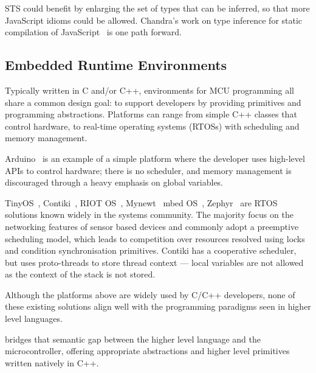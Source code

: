 STS could benefit by enlarging the set of types
that can be inferred, so that more JavaScript idioms could be allowed.
Chandra's work on type inference for static compilation of
JavaScript~\cite{ChandraOOPSLA2016} is one path forward.

\subsection{Embedded Runtime Environments}

Typically written in C and/or C++, environments for MCU programming all share
a common design goal: to support developers by providing primitives and programming
abstractions. Platforms can range from simple C++ classes that control hardware,
to real-time operating systems (RTOSs) with scheduling and memory management.

Arduino~\cite{buildingArduino2014} is an example of a simple platform where the developer uses
high-level APIs to control hardware; there is no scheduler, and memory management
is discouraged through a heavy emphasis on global variables.

TinyOS~\cite{levis2005tinyos}, Contiki~\cite{dunkels2012contiki}, RIOT OS~\cite{baccelli2013riot}, Mynewt~\cite{ApacheMy53:online} mbed OS~\cite{ARMmbed}, Zephyr~\cite{HomeZeph63:online} are RTOS solutions known widely in the systems community. The majority focus on the networking features of sensor based devices and commonly adopt a preemptive scheduling model, which leads to competition over resources resolved using locks and condition synchronisation primitives. Contiki has a cooperative scheduler, but uses proto-threads to store thread context --- local variables are not allowed as the context of the stack is not stored.

Although the platforms above are widely used by C/C++ developers, none of these existing solutions align well with the programming paradigms seen in higher level languages.

\CO bridges that semantic gap between the higher level language and the microcontroller, offering appropriate abstractions and higher level primitives written natively in C++.


